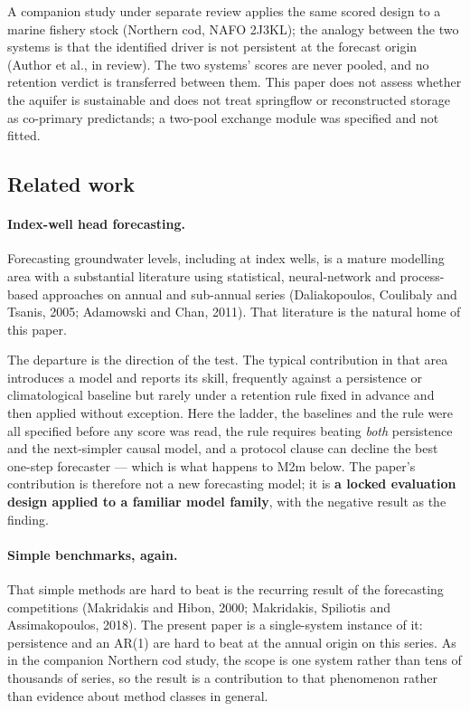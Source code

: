 \documentclass[11pt]{article}
\begin{document}
A companion study under separate review applies the same scored design
to a marine fishery stock (Northern cod, NAFO 2J3KL); the analogy
between the two systems is that the identified driver is not persistent
at the forecast origin (Author et al., in review). The two systems'
scores are never pooled, and no retention verdict is transferred between
them. This paper does not assess whether the aquifer is sustainable and
does not treat springflow or reconstructed storage as co-primary
predictands; a two-pool exchange module was specified and not fitted.

\subsection{Related work}
\label{edw-priorart}

\paragraph{Index-well head forecasting.} Forecasting groundwater levels, including at
index wells, is a mature modelling area with a substantial literature using statistical,
neural-network and process-based approaches on annual and sub-annual series (Daliakopoulos,
Coulibaly and Tsanis, 2005; Adamowski and Chan, 2011). That literature is the natural home of
this paper.

The departure is the direction of the test. The typical contribution in that area introduces a
model and reports its skill, frequently against a persistence or climatological baseline but
rarely under a retention rule fixed in advance and then applied without exception. Here the
ladder, the baselines and the rule were all specified before any score was read, the rule
requires beating \emph{both} persistence and the next-simpler causal model, and a protocol
clause can decline the best one-step forecaster --- which is what happens to M2m below. The
paper's contribution is therefore not a new forecasting model; it is \textbf{a locked
evaluation design applied to a familiar model family}, with the negative result as the
finding.

\paragraph{Simple benchmarks, again.} That simple methods are hard to beat is the recurring
result of the forecasting competitions (Makridakis and Hibon, 2000; Makridakis, Spiliotis and
Assimakopoulos, 2018). The present paper is a single-system instance of it: persistence and an
AR(1) are hard to beat at the annual origin on this series. As in the companion Northern cod
study, the scope is one system rather than tens of thousands of series, so the result is a
contribution to that phenomenon rather than evidence about method classes in general.
\end{document}
